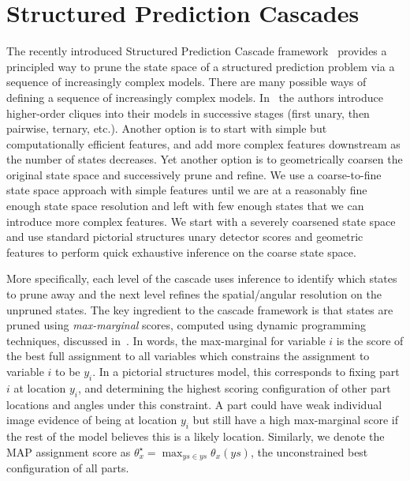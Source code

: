 \section{Structured Prediction Cascades} \label{sec:SPC}
The recently introduced Structured Prediction Cascade framework~\cite{cascades} 
provides a principled way to prune the state space of a structured prediction 
problem via a sequence of increasingly complex models.
There are many possible ways of defining a sequence of increasingly complex 
models.  In~\cite{cascades} the authors introduce higher-order cliques into 
their models in successive stages (first unary, then pairwise, ternary, etc.).  
Another option is to start with simple but computationally efficient features, 
and add more complex features downstream as the number of states decreases.  
Yet another option is to geometrically coarsen the original state space and 
successively prune and refine.
 We use a coarse-to-fine state space approach with simple features until we are 
at a reasonably fine enough state space resolution and left with few enough 
states that we can introduce more complex features.  We start with a severely 
coarsened state space and use standard pictorial structures unary detector 
scores and geometric features to perform quick exhaustive inference on the 
coarse state space.  

More specifically, each level of the cascade uses inference to identify which 
states to prune away and the next level refines the spatial/angular resolution 
on the unpruned states.
The key ingredient to the cascade framework is that states are pruned using 
{\em max-marginal} scores, computed using dynamic programming techniques, 
discussed in~.  In words, the max-marginal for variable 
$i$ is the score of the best full assignment to all variables which constrains 
the assignment to variable $i$ to be $y_i$.  In a pictorial structures model, 
this corresponds to fixing part $i$ at location $y_i$, and determining the 
highest scoring configuration of other part locations and angles under this 
constraint.  A part could have weak individual image evidence of being at 
location $y_i$ but still have a high max-marginal score if the rest of the 
model believes this is a likely location.  Similarly, we denote the MAP 
assignment score as
$\theta_x^\star = \max_{ys \in ys} \theta_x(ys)$, the unconstrained best configuration of all parts.



